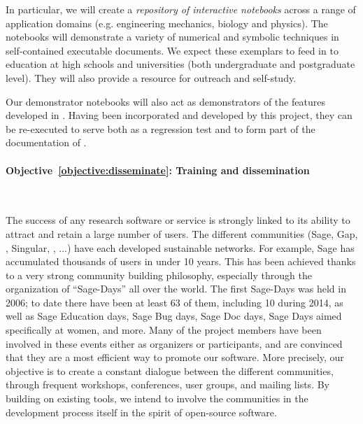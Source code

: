 \documentclass[noworkareas,deliverables,\classoptions]{euproposal}       %
\begin{document}
\begin{proposal}
In particular, we will create a \emph{repository of interactive
 notebooks} \taskref{}{} across a range of application domains (e.g. engineering
mechanics, biology and physics). The notebooks will demonstrate a
variety of numerical and symbolic techniques in self-contained
executable documents. We expect these exemplars to feed in to
education at high schools and universities (both undergraduate and
postgraduate level). They will also provide a resource for outreach
and self-study.

Our demonstrator notebooks will also act as demonstrators of the
features developed in \TheProject. Having been incorporated and
developed by this project, they can be re-executed to serve both as a
regression test and to form part of the documentation of \TheProject.



\paragraph{Objective~\ref{objective:disseminate}: Training and dissemination}\ 

The success of any research software or service is strongly linked to
its ability to attract and retain a large number of users. The
different communities (Sage, Gap, \PariGP, Singular, \Jupyter, ...)
have each developed sustainable networks. For example, Sage has
accumulated thousands of users in under 10 years. This has been
achieved thanks to a very strong community building philosophy,
especially through the organization of ``Sage-Days'' all over the
world. The first Sage-Days was held in 2006; to date there have been
at least 63 of them, including 10 during 2014, as well as Sage
Education days, Sage Bug days, Sage Doc days, Sage Days aimed
specifically at women, and more. Many of the \TheProject{} project
members have been involved in these events either as organizers or
participants, and are convinced that they are a most efficient way to
promote our software. More precisely, our objective is to create a
constant dialogue between the different communities, through frequent
workshops, conferences, user groups, and mailing lists. By building on
existing tools, we intend to involve the communities in the
development process itself in the spirit of open-source software.


\end{proposal}
\end{document}
